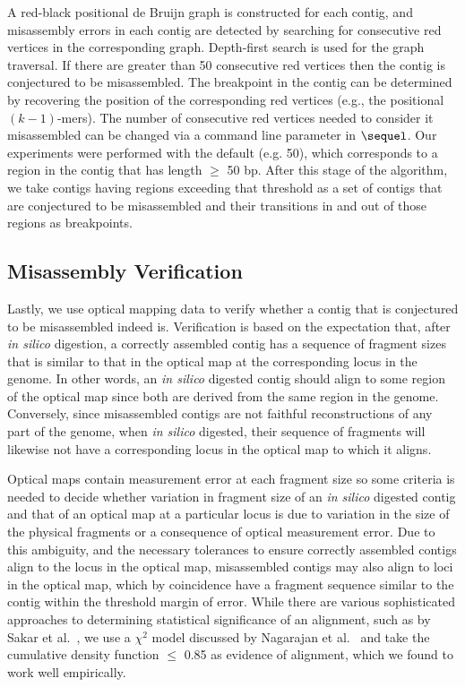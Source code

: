 \documentclass[doctor]{thesis}
\begin{document}
A red-black positional de Bruijn graph is constructed for each contig, and misassembly errors in each contig are detected by searching for consecutive red vertices in the corresponding graph.  Depth-first search is used for the graph traversal. If there are greater than 50 consecutive red vertices then the contig is conjectured to be misassembled.  The breakpoint in the contig can be determined by recovering the position of the corresponding red vertices (e.g., the positional $(k - 1)$-mers).  The number of consecutive red vertices needed to consider it misassembled can be changed via a command line parameter in $\sequel$.  Our experiments were performed with the default (e.g. 50), which corresponds to a region in the contig that has length $\geq$ 50 bp.  After this stage of the algorithm, we take contigs having regions exceeding that threshold as a set of contigs that are conjectured to be misassembled and their transitions in and out of those regions as breakpoints.

\subsection{Misassembly Verification} \label{dev}

Lastly, we use optical mapping data to verify whether a contig that is conjectured to be misassembled indeed is.  
Verification is based on the expectation that, after {\em in silico} digestion, a correctly assembled contig has a sequence of fragment sizes that is similar to that in the optical map at the corresponding locus in the genome.  In other words, an {\em in silico} digested contig should align to some region of the optical map since both are derived from the same region in the genome.
Conversely, since misassembled contigs are not faithful reconstructions of any part of the genome, when {\em in silico} digested, their sequence of fragments will likewise not have a corresponding locus in the optical map to which it aligns.  

Optical maps contain measurement error at each fragment size so some criteria is needed to decide whether variation in fragment size of an {\em in silico} digested contig and that of an optical map at a particular locus is due to variation in the size of the physical fragments or a consequence of optical measurement error.  
Due to this ambiguity, and the necessary tolerances to ensure correctly assembled contigs align to the locus in the optical map, misassembled contigs may also align to loci in the optical map, which by coincidence have a fragment sequence similar to the contig within the threshold margin of error.  
While there are various sophisticated approaches to determining statistical significance of an alignment, such as by Sakar et al.~\cite{statsigORMalign}, we use a $ \chi^2 $ model discussed by Nagarajan et al.~\cite{soma} and take the cumulative density function $\le$ 0.85 as evidence of alignment, which we found to work well empirically.
\end{document}
